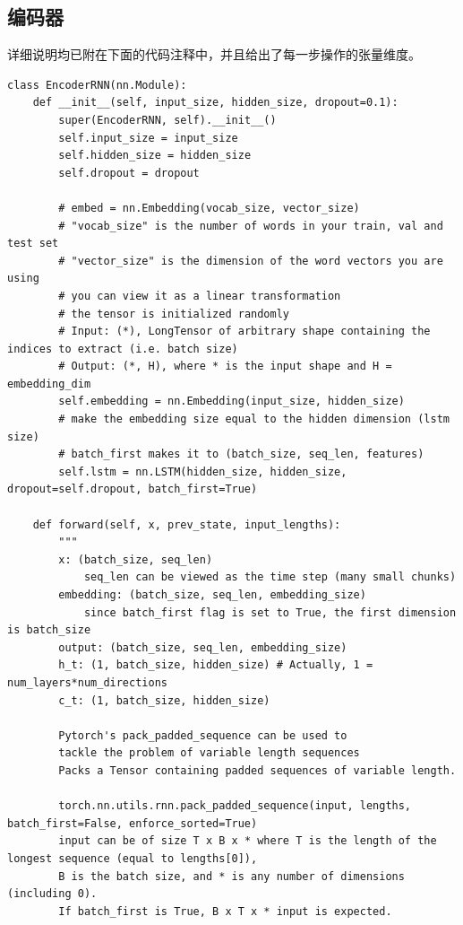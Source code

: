 \documentclass[logo,reportComp]{thesis}
\begin{document}
\subsection{编码器}
详细说明均已附在下面的代码注释中，并且给出了每一步操作的张量维度。
\begin{lstlisting}
class EncoderRNN(nn.Module):
    def __init__(self, input_size, hidden_size, dropout=0.1):
        super(EncoderRNN, self).__init__()
        self.input_size = input_size
        self.hidden_size = hidden_size
        self.dropout = dropout

        # embed = nn.Embedding(vocab_size, vector_size)
        # "vocab_size" is the number of words in your train, val and test set
        # "vector_size" is the dimension of the word vectors you are using
        # you can view it as a linear transformation
        # the tensor is initialized randomly
        # Input: (*), LongTensor of arbitrary shape containing the indices to extract (i.e. batch size)
        # Output: (*, H), where * is the input shape and H = embedding_dim
        self.embedding = nn.Embedding(input_size, hidden_size)
        # make the embedding size equal to the hidden dimension (lstm size)
        # batch_first makes it to (batch_size, seq_len, features)
        self.lstm = nn.LSTM(hidden_size, hidden_size, dropout=self.dropout, batch_first=True)

    def forward(self, x, prev_state, input_lengths):
        """
        x: (batch_size, seq_len)
            seq_len can be viewed as the time step (many small chunks)
        embedding: (batch_size, seq_len, embedding_size)
            since batch_first flag is set to True, the first dimension is batch_size
        output: (batch_size, seq_len, embedding_size)
        h_t: (1, batch_size, hidden_size) # Actually, 1 = num_layers*num_directions
        c_t: (1, batch_size, hidden_size)

        Pytorch's pack_padded_sequence can be used to
        tackle the problem of variable length sequences
        Packs a Tensor containing padded sequences of variable length.

        torch.nn.utils.rnn.pack_padded_sequence(input, lengths, batch_first=False, enforce_sorted=True)
        input can be of size T x B x * where T is the length of the longest sequence (equal to lengths[0]),
        B is the batch size, and * is any number of dimensions (including 0).
        If batch_first is True, B x T x * input is expected.


\end{lstlisting}
\end{document}
